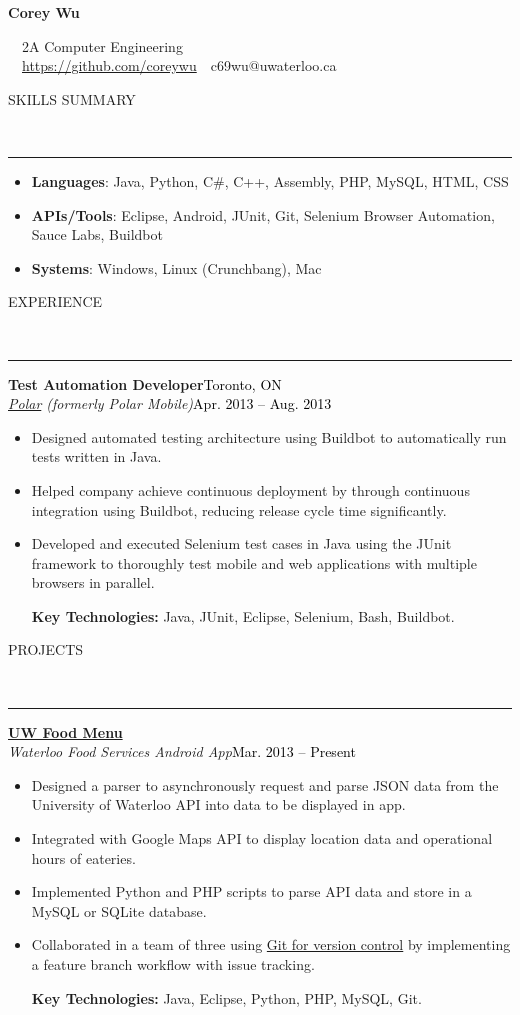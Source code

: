 \documentclass[11pt, letterpaper, oneside]{article}
\makeatletter
\newcommand{\name}{Corey Wu}
\newcommand{\program}{2A Computer Engineering}
\newcommand{\github}{\href{https://github.com/coreywu}{https://github.com/coreywu}}
\newcommand{\email}{c69wu@uwaterloo.ca}
\newcommand{\HRule}[2]{\textcolor{#1}{\rule{\linewidth}{#2}}}
\newcommand{\sectiontitle}[1]{\begin{minipage}{\textwidth}\vspace{-7.5pt}\begin{flushleft}\hspace{-20.5pt}\vspace{-25pt}
\Large\MakeUppercase{#1}\end{flushleft}\end{minipage}\\\HRule{black}{0.15mm}\vspace{\baselineskip}}
\newenvironment{ressection}[1]{
  \sectiontitle{#1}}
  {\vspace{-\baselineskip}}
\newcommand{\resentryheader}[4]{
    \vspace{-6pt}
    \textbf{#1}\hspace{\stretch{1}}\textcolor{black}{#3}\\
    \textit{#2}\hspace{\stretch{1}}\textcolor{black}{#4}\\
}
\newcommand{\resitem}[1]{
    \vspace{2pt}
    \item \begin{flushleft} #1 \end{flushleft}
}
\newcommand{\resskillsitem}[2]{
	\vspace{-12pt}
    \item \begin{flushleft} \textbf{#1}: #2 \end{flushleft}
    \vspace{4pt}
}
\newenvironment{resentry}[4]{
  \begin{minipage}{\textwidth}
    \resentryheader{#1}{#2}{#3}{#4}
        \vspace{-\baselineskip}
    \begin{itemize}[noitemsep,nolistsep]
}{
    \end{itemize}
        \vspace{\baselineskip}
        \end{minipage}
}
\makeatother
\begin{document}
\begin{center}
{\Huge \textbf{\name}}

\ \ {\Large{\program}} \\
\ \ \github \ \textbullet \ \email \ \
\end{center}

\vspace{-10pt}

\begin{ressection}{Skills Summary}
\begin{itemize}
\vspace{-6.5pt}
\resskillsitem{Languages}{Java, Python, C\#, C++, Assembly, PHP, MySQL, HTML, CSS}
\resskillsitem{APIs/Tools}{Eclipse, Android, JUnit, Git, Selenium Browser Automation, Sauce Labs, Buildbot}
\resskillsitem{Systems}{Windows, Linux (Crunchbang), Mac}
\end{itemize}
\end{ressection}

\begin{ressection}{Experience}
  \begin{resentry}{Test Automation Developer}{\href{http://polar.me/}{Polar} (formerly Polar Mobile)}{Toronto, ON}{Apr. 2013 -- Aug. 2013}
    \resitem{Designed automated testing architecture using Buildbot to automatically run tests written in Java.}
    \resitem{Helped company achieve continuous deployment by through continuous integration using Buildbot, reducing release cycle time significantly.}
    \resitem{Developed and executed Selenium test cases in Java using the JUnit framework to thoroughly test mobile and web applications with multiple browsers in parallel.}
    \vspace{4pt} \hspace{-15pt}
    \textbf{Key Technologies:} Java, JUnit, Eclipse, Selenium, Bash, Buildbot.
  \end{resentry}
\end{ressection}

\begin{ressection}{Projects}
  \begin{resentry}{\href{https://play.google.com/store/apps/details?id=ca.uwaterloo.uwfoodservices&hl=en}{UW Food Menu}}{Waterloo Food Services Android App}{}{Mar. 2013 -- Present}
    \resitem{Designed a parser to asynchronously request and parse JSON data from the University of Waterloo API into data to be displayed in app.}
    \resitem{Integrated with Google Maps API to display location data and operational hours of eateries.}
    \resitem{Implemented Python and PHP scripts to parse API data and store in a MySQL or SQLite database.}
    \resitem{Collaborated in a team of three using \href{https://github.com/shamak/FoodMenuUW/tree/DEV_1.2}{Git for version control} by implementing a feature branch workflow with issue tracking.}
    \vspace{4pt} \hspace{-15pt}
    \textbf{Key Technologies:} Java, Eclipse, Python, PHP, MySQL, Git.
  \end{resentry}
\end{ressection}
\end{document}
